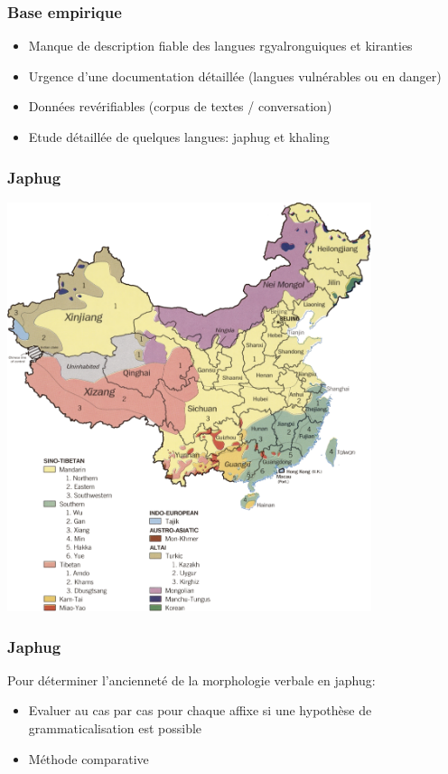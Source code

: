 \documentclass[xcolor=table]{beamer}
\newcommand{\bleu}[1]{{\color{blue}#1}}
\begin{document}
\begin{frame} 
\frametitle{Base empirique}

\begin{itemize}[<+->]
\item Manque de description fiable des langues rgyalronguiques et kiranties
\item Urgence d'une documentation détaillée (langues vulnérables ou en danger) 
\item Données \bleu{revérifiables} (corpus de textes / conversation)
\item Etude détaillée de quelques langues: \bleu{japhug} et \bleu{khaling}
\end{itemize}

\end{frame} 


 

\begin{frame} 
\frametitle{Japhug}
\includegraphics[width=0.8\textwidth]{chinalingmap.jpg} \centering
\end{frame} 

\begin{frame} 
\frametitle{Japhug}
Pour déterminer l'ancienneté de la morphologie verbale en japhug:
\begin{itemize}[<+->]
\item Evaluer au cas par cas pour chaque affixe si une hypothèse de grammaticalisation est possible
\item Méthode comparative
\end{itemize}
\end{frame} 
\end{document}
